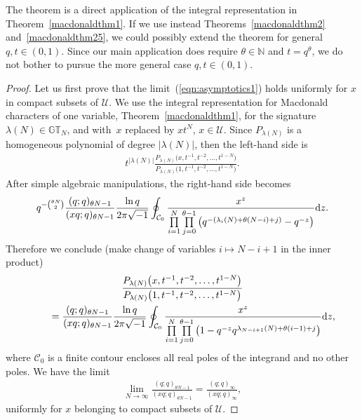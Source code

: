 \documentclass[pdftex]{sigma}
\numberwithin{equation}{section}
\newcommand{\N}{\mathbb{N}}
\newcommand{\U}{\mathcal{U}}
\newcommand{\CC}{\mathcal{C}}
\newcommand{\GT}{\mathbb{GT}}
\begin{document}
\begin{rem}The theorem is a direct application of the integral representation in Theorem~\ref{macdonaldthm1}. If we use instead Theorems~\ref{macdonaldthm2} and~\ref{macdonaldthm25}, we could possibly extend the theorem for general $q, t\in(0, 1)$. Since our main application does require $\theta\in\N$ and $t = q^{\theta}$, we do not bother to pursue the more general case $q, t\in(0, 1)$.
\end{rem}

\begin{proof}Let us f\/irst prove that the limit~(\ref{eqn:asymptotics1}) holds uniformly for $x$ in compact subsets of $\U$. We use the integral representation for Macdonald characters of one variable, Theorem~\ref{macdonaldthm1}, for the signature $\lambda(N)\in\GT_N$, and with~$x$ replaced by $xt^N$, $x \in \U$. Since $P_{\lambda(N)}$ is a homogeneous polynomial of degree $|\lambda(N)|$, then the left-hand side is
\begin{gather*}
 t^{|\lambda(N)|}\frac{P_{\lambda(N)}\big(x, t^{-1}, t^{-2}, \dots, t^{1-N}\big)}{P_{\lambda(N)}\big(1, t^{-1}, t^{-2}, \dots, t^{1-N}\big)}.
\end{gather*}
After simple algebraic manipulations, the right-hand side becomes
\begin{gather*}
q^{-{\theta N \choose 2}}\frac{(q; q)_{\theta N - 1}}{(xq; q)_{\theta N - 1}}\frac{\ln{q}}{2\pi\sqrt{-1}}\oint_{\CC_0}{\frac{x^z}{\prod\limits_{i=1}^N\prod\limits_{j=0}^{\theta - 1}{\big(q^{-(\lambda_i(N) + \theta(N-i) + j)} - q^{-z}\big)}}}{\rm d}z.
\end{gather*}
Therefore we conclude (make change of variables $i\mapsto N - i + 1$ in the inner product)
\begin{gather}
\frac{P_{\lambda(N)}\big(x, t^{-1}, t^{-2}, \dots, t^{1-N}\big)}{P_{\lambda(N)}\big(1, t^{-1}, t^{-2}, \dots, t^{1-N}\big)} \nonumber\\
\qquad{} = \frac{(q; q)_{\theta N - 1}}{(xq; q)_{\theta N - 1}}\frac{\ln{q}}{2\pi\sqrt{-1}}\oint_{\CC_0}{\frac{x^z}{\prod\limits_{i=1}^N\prod\limits_{j=0}^{\theta - 1}{\big(1 - q^{-z}q^{\lambda_{N-i+1}(N) + \theta(i - 1) + j}\big)}}{\rm d}z},\label{eq:beforelimit}
\end{gather}
where $\CC_0$ is a f\/inite contour encloses all real poles of the integrand and no other poles. We have the limit
\begin{gather*}
\lim_{N\rightarrow\infty}{\frac{(q; q)_{\theta N - 1}}{(xq; q)_{\theta N - 1}}} = \frac{(q; q)_{\infty}}{(xq; q)_{\infty}},
\end{gather*}
uniformly for $x$ belonging to compact subsets of $\mathcal{U}$.


\end{proof}
\end{document}

